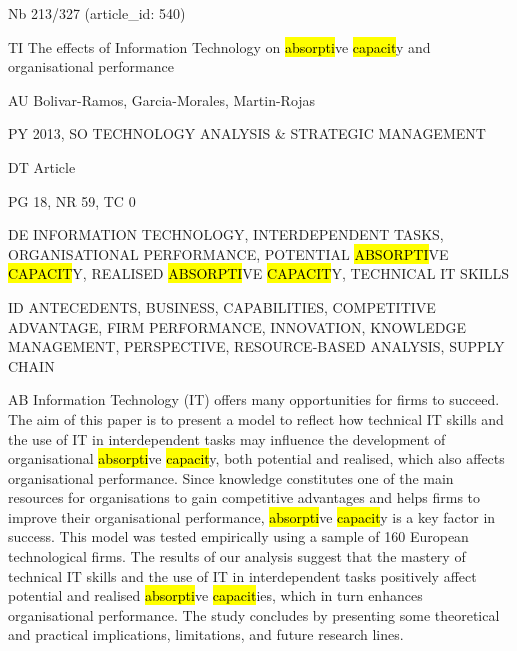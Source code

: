 \documentclass[a4paper]{article}
\begin{document}
\vspace*{-2cm}
Nb \tabto{0cm}213/327 (article\_id: 540)\par
TI \tabto{0cm}The effects of Information Technology on \hl{absorpti}ve \hl{capacit}y and organisational performance\par
AU \tabto{0cm}Bolivar-Ramos, Garcia-Morales, Martin-Rojas\par
PY \tabto{0cm}2013, SO TECHNOLOGY ANALYSIS \& STRATEGIC MANAGEMENT\par
DT \tabto{0cm}Article\par
PG \tabto{0cm}18, NR 59, TC 0\par
DE \tabto{0cm}INFORMATION TECHNOLOGY, INTERDEPENDENT TASKS, ORGANISATIONAL PERFORMANCE, POTENTIAL \hl{ABSORPTI}VE \hl{CAPACIT}Y, REALISED \hl{ABSORPTI}VE \hl{CAPACIT}Y, TECHNICAL IT SKILLS\par
ID \tabto{0cm}ANTECEDENTS, BUSINESS, CAPABILITIES, COMPETITIVE ADVANTAGE, FIRM PERFORMANCE, INNOVATION, KNOWLEDGE MANAGEMENT, PERSPECTIVE, RESOURCE-BASED ANALYSIS, SUPPLY CHAIN\par
AB \tabto{0cm}Information Technology (IT) offers many opportunities for firms to succeed. The aim of this paper is to present a model to reflect how technical IT skills and the use of IT in interdependent tasks may influence the development of organisational \hl{absorpti}ve \hl{capacit}y, both potential and realised, which also affects organisational performance. Since knowledge constitutes one of the main resources for organisations to gain competitive advantages and helps firms to improve their organisational performance, \hl{absorpti}ve \hl{capacit}y is a key factor in success. This model was tested empirically using a sample of 160 European technological firms. The results of our analysis suggest that the mastery of technical IT skills and the use of IT in interdependent tasks positively affect potential and realised \hl{absorpti}ve \hl{capacit}ies, which in turn enhances organisational performance. The study concludes by presenting some theoretical and practical implications, limitations, and future research lines.\par
\clearpage
\end{document}
